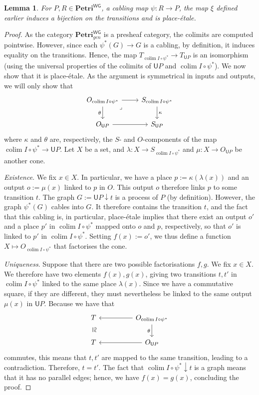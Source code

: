 \documentclass[11pt,a4paper]{article}
\theoremstyle{plain}
\newtheorem{lemma}[theorem]{Lemma}
\theoremstyle{definition}
\theoremstyle{remark}
\newcommand{\WGPetri}{\mathbf{Petri}^{\mathsf{WG}}}
\newcommand{\U}{\mathsf{U}}
\newcommand{\Colim}{\colim}
\DeclareMathOperator*{\colim}{colim}
\begin{document}
\begin{lemma}
    For $P, R \in \WGPetri$, a cabling map $\psi : R \rightarrow P$, the map $\xi$ defined earlier induces a bijection on the transitions and is place-\'etale.
\end{lemma}
\begin{proof}
As the category $\WGPetri_{gen}$ is a presheaf category, the colimits are computed pointwise. However, since each $\psi^*(G) \rightarrow G$ is a cabling, by definition, it induces equality on the transitions. Hence, the map $T_{\Colim I \circ \psi^*} \rightarrow T_{\U P}$ is an isomorphism (using the universal properties of the colimits of $\U P$ and $\Colim I \circ \psi^*$). We now show that it is place-\'etale. As the argument is symmetrical in inputs and outputs, we will only show that
\[\begin{tikzcd}
	{O_{\Colim I \circ \psi^*}} & {S_{\Colim I \circ \psi^*}} \\
	{O_{\U P}} & {S_{\U P}}
	\arrow[from=1-1, to=1-2]
	\arrow["\theta"', from=1-1, to=2-1]
	\arrow["\lrcorner"{anchor=center, pos=0.125}, draw=none, from=1-1, to=2-2]
	\arrow["\kappa", from=1-2, to=2-2]
	\arrow[from=2-1, to=2-2]
\end{tikzcd}\]
where $\kappa$ and $\theta$ are, respectively, the $S$- and $O$-components of the map $\Colim I \circ \psi^* \rightarrow \U P$.
Let $X$ be a set, and $\lambda : X \rightarrow S_{\Colim I \circ \psi^*}$ and $\mu : X \rightarrow O_{\U P}$ be another cone.

\emph{Existence}.
We fix $x \in X$. In particular, we have a place $p := \kappa(\lambda(x))$ and an output $o := \mu(x)$ linked to $p$ in $O$. This output $o$ therefore links $p$ to some transition $t$. The graph $G := \U P \downarrow t$ is a process of $P$ (by definition). However, the graph $\psi^*(G)$ cables into $G$. It therefore contains the transition $t$, and the fact that this cabling is, in particular, place-\'etale implies that there exist an output $o'$ and a place $p'$ in $\Colim I \circ \psi^*$ mapped onto $o$ and $p$, respectively, so that $o'$ is linked to $p'$ in $\Colim I \circ \psi^*$. Setting $f(x) := o'$, we thus define a function $X \mapsto O_{\Colim I \circ \psi^*}$ that factorises the cone.

\emph{Uniqueness}.
Suppose that there are two possible factorisations $f, g$. We fix $x \in X$. We therefore have two elements $f(x), g(x)$, giving two transitions $t, t'$ in $\Colim I \circ \psi^*$ linked to the same place $\lambda(x)$. Since we have a commutative square, if they are different, they must nevertheless be linked to the same output $\mu(x)$ in $\U P$. Because we have that
\[\begin{tikzcd}
	T && {O_{\Colim I \circ \psi^*}} \\
	T && {O_{\U P}}
	\arrow["\cong"{marking, allow upside down}, draw=none, from=1-1, to=2-1]
	\arrow[from=1-3, to=1-1]
	\arrow["\theta"', from=1-3, to=2-3]
	\arrow[from=2-3, to=2-1]
\end{tikzcd}\]
commutes, this means that $t, t'$ are mapped to the same transition, leading to a contradiction. Therefore, $t = t'$. The fact that $\Colim I \circ \psi^* \downarrow t$ is a graph means that it has no parallel edges; hence, we have $f(x) = g(x)$, concluding the proof.
\end{proof}
\end{document}
